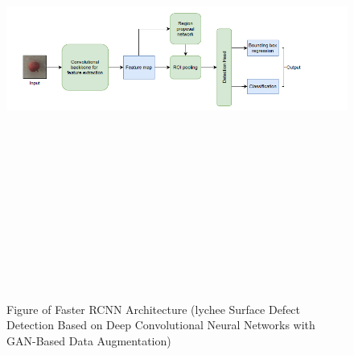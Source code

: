  \begin{figure}[H]
    \centering
    \includegraphics[width=1\textwidth,height=15cm,keepaspectratio]{Images/FasterRCNN.PNG}\\
    \caption{Figure of Faster RCNN Architecture (lychee Surface Defect Detection Based on Deep Convolutional Neural Networks with GAN-Based Data Augmentation)\cite{litReviewLychee}}
    \label{fig:Figure of Faster RCNN Architecture for lychee Classification Model (lychee Surface Defect Detection Based on Deep Convolutional Neural Networks with GAN-Based Data Augmentation) }
\end{figure}
\vspace{0.5mm}
